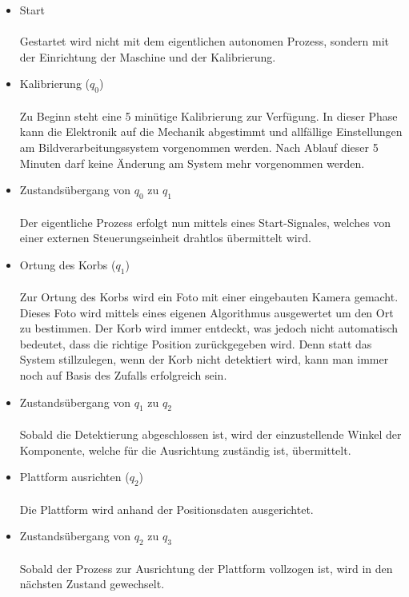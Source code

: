 \begin{itemize}
	
	\item Start \\ \\
		Gestartet wird nicht mit dem eigentlichen autonomen Prozess, sondern mit der Einrichtung der Maschine und der Kalibrierung.
	
	\item Kalibrierung ($q_{0}$) \\ \\
	    Zu Beginn steht eine 5 minütige Kalibrierung zur Verfügung. In dieser Phase kann die Elektronik auf die Mechanik abgestimmt und allfällige Einstellungen am Bildverarbeitungssystem vorgenommen werden. Nach Ablauf dieser 5 Minuten darf keine Änderung am System mehr
		vorgenommen werden.
		
	\item Zustandsübergang von $q_{0}$ zu $q_{1}$ \\ \\
		  Der eigentliche Prozess erfolgt nun mittels eines Start-Signales, welches von einer externen Steuerungseinheit drahtlos übermittelt wird.
		
	\item Ortung des Korbs ($q_{1}$) \\ \\
		  Zur Ortung des Korbs wird ein Foto mit einer eingebauten Kamera gemacht. Dieses Foto wird mittels eines eigenen Algorithmus ausgewertet um den Ort zu bestimmen. Der Korb wird immer entdeckt, was jedoch nicht automatisch bedeutet, dass die richtige Position zurückgegeben wird. Denn statt das System stillzulegen, wenn der Korb nicht detektiert wird, kann man immer noch auf Basis des Zufalls erfolgreich sein.

	\newpage
		  
	\item Zustandsübergang von $q_{1}$ zu $q_{2}$ \\ \\
		  Sobald die Detektierung abgeschlossen ist, wird der einzustellende Winkel der Komponente, welche für die Ausrichtung zuständig ist, übermittelt.
		  
	\item Plattform ausrichten ($q_{2}$) \\ \\
		  Die Plattform wird anhand der Positionsdaten ausgerichtet.
		  
	\item Zustandsübergang von $q_{2}$ zu $q_{3}$ \\ \\
		  Sobald der Prozess zur Ausrichtung der Plattform vollzogen ist, wird in den nächsten Zustand gewechselt.
		  

\end{itemize}
